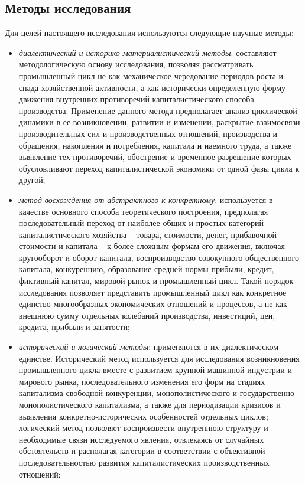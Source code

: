 \subsection*{Методы исследования}
Для целей настоящего исследования используются следующие научные методы:
\begin{itemize}
    \item \textit{диалектический и историко-материалистический методы}: составляют методологическую основу исследования, позволяя рассматривать промышленный цикл не как механическое чередование периодов роста и спада хозяйственной активности, а как исторически определенную форму движения внутренних противоречий капиталистического способа производства. Применение данного метода предполагает анализ циклической динамики в ее возникновении, развитии и изменении, раскрытие взаимосвязи производительных сил и производственных отношений, производства и обращения, накопления и потребления, капитала и наемного труда, а также выявление тех противоречий, обострение и временное разрешение которых обусловливают переход капиталистической экономики от одной фазы цикла к другой;
    \item \textit{метод восхождения от абстрактного к конкретному}: используется в качестве основного способа теоретического построения, предполагая последовательный переход от наиболее общих и простых категорий капиталистического хозяйства – товара, стоимости, денег, прибавочной стоимости и капитала – к более сложным формам его движения, включая кругооборот и оборот капитала, воспроизводство совокупного общественного капитала, конкуренцию, образование средней нормы прибыли, кредит, фиктивный капитал, мировой рынок и промышленный цикл. Такой порядок исследования позволяет представить промышленный цикл как конкретное единство многообразных экономических отношений и процессов, а не как внешнюю сумму отдельных колебаний производства, инвестиций, цен, кредита, прибыли и занятости;
    \item \textit{исторический и логический методы}: применяются в их диалектическом единстве. Исторический метод используется для исследования возникновения промышленного цикла вместе с развитием крупной машинной индустрии и мирового рынка, последовательного изменения его форм на стадиях капитализма свободной конкуренции, монополистического и государственно-монополистического капитализма, а также для периодизации кризисов и выявления конкретно-исторических особенностей отдельных циклов; логический метод позволяет воспроизвести внутреннюю структуру и необходимые связи исследуемого явления, отвлекаясь от случайных обстоятельств и располагая категории в соответствии с объективной последовательностью развития капиталистических производственных отношений;

\end{itemize}
